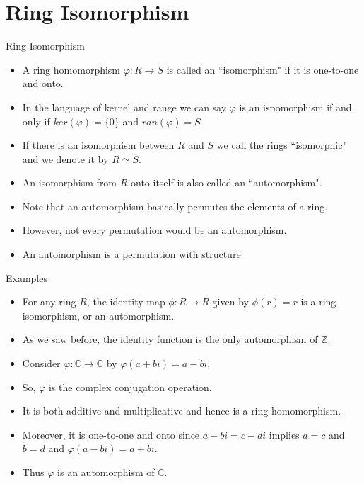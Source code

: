 \documentclass[ %
 10pt, xcolor={dvipsnames,svgnames,x11names,hyperref},
   hyperref={colorlinks=true,citecolor=green,linkcolor=DarkRed,urlcolor=ProcessBlue,anchorcolor=blue}
  ]{beamer}
\newenvironment{stepitemize}{\begin{itemize}[<+->]}{\end{itemize} }
\newcommand{\Z}{\mathbb{Z}}
\newcommand{\C}{\mathbb{C}}
\begin{document}
\section{Ring Isomorphism}
\begin{frame}{Ring Isomorphism}
    \begin{stepitemize}
    \item A ring homomorphism $\varphi:R\rightarrow S$ is called an ``isomorphism" if it is one-to-one and onto.
    \item In the language of kernel and range we can say $\varphi$ is an ispomorphism if and only if $ker(\varphi)=\{0\}$ and $ran(\varphi)=S$
    \item If there is an isomorphism between $R$ and $S$ we call the rings ``isomorphic" and we denote it by $R\simeq S$.
    \item An isomorphism from $R$ onto itself is also called an ``automorphism".
    \item Note that an automorphism basically permutes the elements of a ring. 
    \item However, not every permutation would be an automorphism. 
    \item An automorphism is a permutation with structure.
    \end{stepitemize}
\end{frame}

\begin{frame}{Examples}
\begin{stepitemize}
 \item For any ring $R$, the identity map $\phi:R\rightarrow R$ given by $\phi(r)=r$ is a ring isomorphism, or an automorphism.
    \item As we saw before, the identity function is the only automorphism of $\Z$. 
    \item Consider $\varphi:\C \rightarrow \C$ by $\varphi(a+bi)=a-bi$,
    \item So, $\varphi$ is the complex conjugation operation. 
    \item It is both additive and multiplicative and hence is a ring homomorphism. 
    \item Moreover, it is one-to-one and onto since $a-bi=c-di$ implies $a=c$ and $b=d$ and $\varphi(a-bi)=a+bi$. 
    \item Thus $\varphi$ is an automorphism of $\C$.
\end{stepitemize}
\end{frame}
\end{document}
